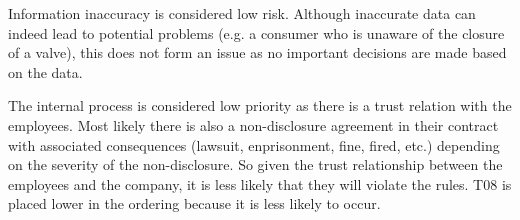 \npar Information inaccuracy is considered low risk. Although inaccurate data
can indeed lead to potential problems (e.g. a consumer who is unaware of the
closure of a valve), this does not form an issue as no important decisions are
made based on the data.

\npar The internal process is considered low priority as there is a trust
relation with the employees. Most likely there is also a non-disclosure
agreement in their contract with associated consequences (lawsuit, enprisonment,
fine, fired, etc.) depending on the severity of the non-disclosure. So given the
trust relationship between the employees and the company, it is less likely that
they will violate the rules. T08 is placed lower in the ordering because it is
less likely to occur.
